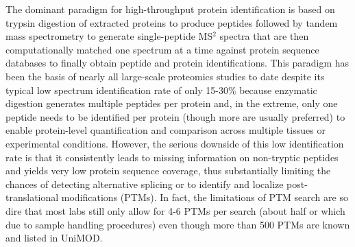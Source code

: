 \documentclass[8.5pt,twoside,twocolumn]{article}
\begin{document}
The dominant paradigm for high-throughput protein identification is based on trypsin digestion of extracted proteins to produce peptides followed by tandem mass spectrometry to generate single-peptide MS$^2$ spectra that are then computationally matched one spectrum at a time against protein sequence databases to finally obtain peptide and protein identifications. This paradigm has been the basis of nearly all large-scale proteomics studies to date despite its typical low spectrum identification rate of only 15-30\% because enzymatic digestion generates multiple peptides per protein and, in the extreme, only one peptide needs to be identified per protein (though more are usually preferred) to enable protein-level quantification and comparison across multiple tissues or experimental conditions. However, the serious downside of this low identification rate is that it consistently leads to missing information on non-tryptic peptides and yields very low protein sequence coverage, thus substantially limiting the chances of detecting alternative splicing or to identify and localize post-translational modifications (PTMs). In fact, the limitations of PTM search are so dire that most labs still only allow for 4-6 PTMs per search (about half or which due to sample handling procedures) even though more than 500 PTMs are known and listed in UniMOD.
\end{document}
